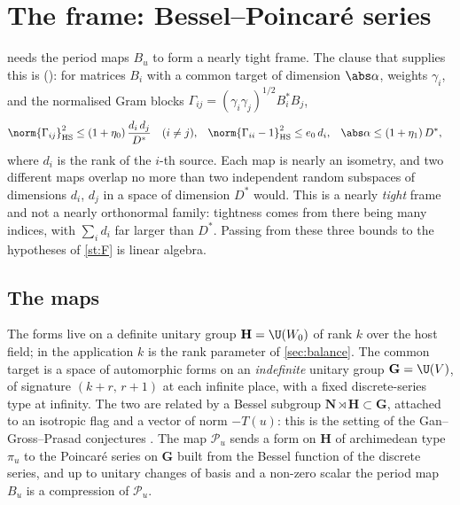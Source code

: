 \section{The frame: Bessel--Poincar\'e series}\label{sec:frame}

 needs the period maps $B_u$ to form a nearly tight frame. The clause that supplies
this is \lvS{} (): for matrices $B_i$ with a common target of dimension
$\abs\alpha$, weights $\gamma_i$, and the normalised Gram blocks
$\Gamma_{ij}=(\gamma_i\gamma_j)^{1/2}B_i^*B_j$,
\begin{align*}
\norm{\Gamma_{ij}}_{\mathrm{HS}}^2&\le(1+\eta_0)\,\frac{d_i\,d_j}{D^*}\quad(i\ne j),&
\norm{\Gamma_{ii}-1}_{\mathrm{HS}}^2&\le e_0\,d_i,&
\abs\alpha&\le(1+\eta_1)\,D^*,
\end{align*}
where $d_i$ is the rank of the $i$-th source. Each map is nearly an isometry, and two different
maps overlap no more than two independent random subspaces of dimensions $d_i$, $d_j$ in a
space of dimension $D^*$ would. This is a nearly \emph{tight} frame and not a nearly
orthonormal family: tightness comes from there being many indices, with $\sum_id_i$ far larger
than $D^*$. Passing from these three bounds to the hypotheses of \cref{st:F} is linear algebra.

\subsection{The maps}
The forms live on a definite unitary group $\mathbf H=\U(W_0)$ of rank $k$ over the host field;
in the application $k$ is the rank parameter of \cref{sec:balance}. The
common target is a space of automorphic forms on an \emph{indefinite} unitary group
$\mathbf G=\U(V)$, of signature $(k+r,\,r+1)$ at each infinite place, with a fixed discrete-series type at
infinity. The two are related by a Bessel subgroup $\mathbf N\rtimes\mathbf H\subset\mathbf G$, attached to an
isotropic flag and a vector of norm $-T(u)$: this is the setting of the Gan--Gross--Prasad
conjectures \cite{ggp2012}. The map $\mathcal P_u$ sends a form on $\mathbf H$ of archimedean type $\pi_u$ to
the Poincar\'e series on $\mathbf G$ built from the Bessel function of the discrete series, and up to
unitary changes of basis and a non-zero scalar the period map $B_u$ is a compression of $\mathcal P_u$.

